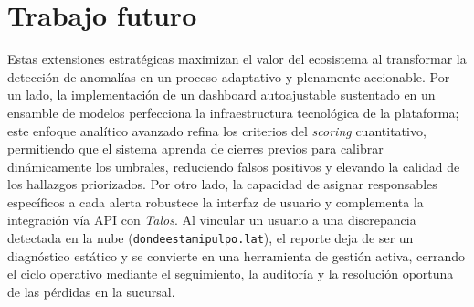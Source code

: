 \documentclass[11pt]{article}
\begin{document}
\section*{Trabajo futuro}
Estas extensiones estratégicas maximizan el valor del ecosistema al transformar la detección de anomalías en un proceso adaptativo y plenamente accionable. Por un lado, la implementación de un dashboard autoajustable sustentado en un ensamble de modelos perfecciona la infraestructura tecnológica de la plataforma; este enfoque analítico avanzado refina los criterios del \textit{scoring} cuantitativo, permitiendo que el sistema aprenda de cierres previos para calibrar dinámicamente los umbrales, reduciendo falsos positivos y elevando la calidad de los hallazgos priorizados. Por otro lado, la capacidad de asignar responsables específicos a cada alerta robustece la interfaz de usuario y complementa la integración vía API con \textit{Talos}. Al vincular un usuario a una discrepancia detectada en la nube (\texttt{dondeestamipulpo.lat}), el reporte deja de ser un diagnóstico estático y se convierte en una herramienta de gestión activa, cerrando el ciclo operativo mediante el seguimiento, la auditoría y la resolución oportuna de las pérdidas en la sucursal.
\end{document}
